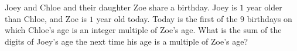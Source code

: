Joey and Chloe and their daughter Zoe share a birthday. Joey is $1$ year older than Chloe, and Zoe is $1$ year old today. Today is the first of the $9$ birthdays on which Chloe's age is an integer multiple of Zoe's age. What is the sum of the digits of Joey's age the next time his age is a multiple of Zoe's age?
